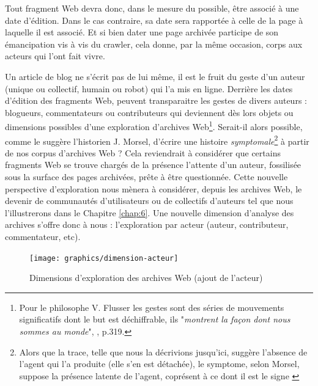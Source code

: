\documentclass[symmetric,justified,marginals=raggedouter]{tufte-book}
\begin{document}

\noindent Tout fragment Web devra donc, dans le mesure du possible, être associé à une date d'édition. Dans le cas contraire, sa date sera rapportée à celle de la page à laquelle il est associé. Et si bien dater une page archivée participe de son émancipation vis à vis du crawler, cela donne, par la même occasion, corps aux acteurs qui l'ont fait vivre. 

Un article de blog ne s'écrit pas de lui même, il est le fruit du geste d'un auteur (unique ou collectif, humain ou robot) qui l'a mis en ligne. Derrière les dates d'édition des fragments Web, peuvent transparaitre les gestes de divers auteurs : blogueurs, commentateurs ou contributeurs qui deviennent dès lors objets ou dimensions possibles d'une exploration d'archives Web\footnote{Pour le philosophe V. Flusser les gestes sont des séries de mouvements significatifs dont le but est déchiffrable, ils "\textit{montrent la façon dont nous sommes au monde}", \citep{flusser_les_2014}, p.319.}. Serait-il alors possible, comme le suggère l'historien J. Morsel, d'écrire une histoire \textit{symptomale}\footnote{Alors que la trace, telle que nous la décrivions jusqu'ici, suggère l'absence de l'agent qui l'a produite (elle s'en est détachée), le symptome, selon Morsel, suppose la présence latente de l'agent, coprésent à ce dont il est le signe \citep{morsel_traces?_2016}} \citep{morsel_traces?_2016} à partir de nos corpus d'archives Web ? Cela reviendrait à considérer que certains fragments Web se trouve chargés de la présence l'attente d'un auteur, fossilisée sous la surface des pages archivées, prête à être questionnée. Cette nouvelle perspective d'exploration nous mènera à considérer, depuis les archives Web, le devenir de communautés d'utilisateurs ou de collectifs d'auteurs tel que nous l'illustrerons dans le Chapitre \ref{chap:6}. Une nouvelle dimension d'analyse des archives s'offre donc à nous : l'exploration par acteur (auteur, contributeur, commentateur, etc).

\begin{figure}[h]
  \centering
  \texttt{[image: graphics/dimension-acteur]}
  \caption{Dimensions d'exploration des archives Web (ajout de l'acteur)}
  \label{fig:dimension-acteur}
\end{figure}
\end{document}
